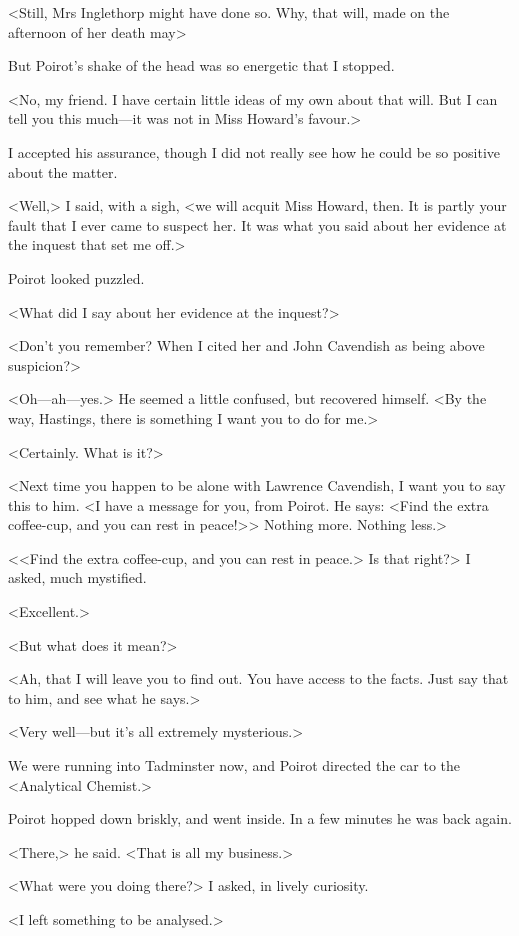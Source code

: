  <Still, Mrs Inglethorp might have done so. Why, that will, made on the afternoon of her death may\longdash> 

 But Poirot's shake of the head was so energetic that I stopped. 

 <No, my friend. I have certain little ideas of my own about that will. But I can tell you this much—it was not in Miss Howard's favour.> 

 I accepted his assurance, though I did not really see how he could be so positive about the matter. 

 <Well,> I said, with a sigh, <we will acquit Miss Howard, then. It is partly your fault that I ever came to suspect her. It was what you said about her evidence at the inquest that set me off.> 

 Poirot looked puzzled. 

 <What did I say about her evidence at the inquest?> 

 <Don't you remember? When I cited her and John Cavendish as being above suspicion?> 

 <Oh—ah—yes.> He seemed a little confused, but recovered himself. <By the way, Hastings, there is something I want you to do for me.> 

 <Certainly. What is it?> 

 <Next time you happen to be alone with Lawrence Cavendish, I want you to say this to him. <I have a message for you, from Poirot. He says: <Find the extra coffee-cup, and you can rest in peace!>> Nothing more. Nothing less.> 

 <<Find the extra coffee-cup, and you can rest in peace.> Is that right?> I asked, much mystified. 

 <Excellent.> 

 <But what does it mean?> 

 <Ah, that I will leave you to find out. You have access to the facts. Just say that to him, and see what he says.> 

 <Very well—but it's all extremely mysterious.> 

 We were running into Tadminster now, and Poirot directed the car to the <Analytical Chemist.> 

 Poirot hopped down briskly, and went inside. In a few minutes he was back again. 

 <There,> he said. <That is all my business.> 

 <What were you doing there?> I asked, in lively curiosity. 

 <I left something to be analysed.> 

